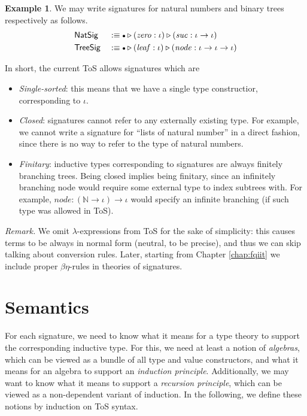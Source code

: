 \documentclass[12pt,a4paper,twoside,openany]{book}
\theoremstyle{remark}
\theoremstyle{definition}
\newtheorem{myexample}{Example}
\theoremstyle{theorem}
\newcommand{\mi}[1]{\mathit{#1}}
\newcommand{\ms}[1]{\mathsf{#1}}
\newcommand{\ext}{\triangleright}
\newcommand{\emptycon}{\scaleobj{.75}\bullet}
\newcommand{\defn}{:\equiv}
\begin{document}
\begin{myexample} We may write signatures for natural numbers and binary trees respectively as follows.
\begin{alignat*}{3}
  & \ms{NatSig}  &&\defn \emptycon \ext (\mi{zero} : \iota) \ext (\mi{suc} : \iota \to \iota)\\
  & \ms{TreeSig} &&\defn \emptycon \ext (\mi{leaf} : \iota) \ext (\mi{node} : \iota \to \iota \to \iota)
\end{alignat*}
\end{myexample}
In short, the current ToS allows signatures which are
\begin{itemize}
\item \emph{Single-sorted}: this means that we have a single type constructior, corresponding to $\iota$.
\item \emph{Closed}: signatures cannot refer to any externally existing type. For example, we cannot write a signature for ``lists of natural number'' in a direct fashion, since there is no way to refer to the type of natural numbers.
\item \emph{Finitary}: inductive types corresponding to signatures are always
  finitely branching trees. Being closed implies being finitary, since an
  infinitely branching node would require some external type to index subtrees
  with. For example, $\mi{node} : (\mathbb{N} \to \iota) \to \iota$ would
  specify an infinite branching (if such type was allowed in ToS).
\end{itemize}

\emph{Remark.} We omit $\lambda$-expressions from ToS for the sake of
simplicity: this causes terms to be always in normal form (neutral, to be
precise), and thus we can skip talking about conversion rules. Later, starting
from Chapter \ref{chap:fqiit} we include proper $\beta\eta$-rules in theories of
signatures.

\section{Semantics}
\label{sec:simple-semantics}

For each signature, we need to know what it means for a type theory to support
the corresponding inductive type. For this, we need at least a notion of
\emph{algebras}, which can be viewed as a bundle of all type and
value constructors, and what it means for an algebra to support an
\emph{induction principle}.  Additionally, we may want to know what it means to
support a \emph{recursion principle}, which can be viewed as a non-dependent
variant of induction. In the following, we define these notions by induction on
ToS syntax.
\end{document}
